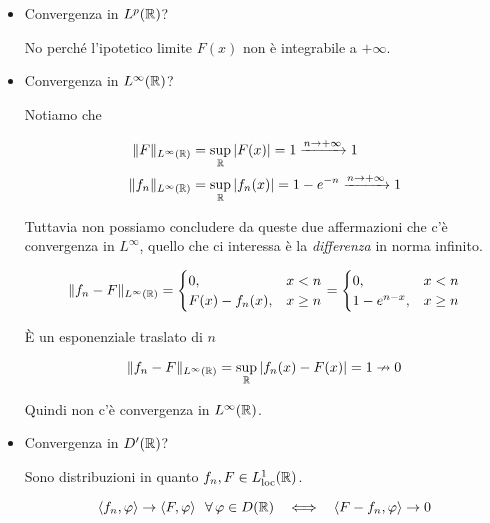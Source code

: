 \begin{itemize}
\item Convergenza in $L^{p}(\mathbb{R})$?

No perché l'ipotetico limite $F(x)$ non è integrabile a $ + \infty $.
\item Convergenza in $L^{\infty }(\mathbb{R})$?

Notiamo che

\begin{equation*}
\begin{aligned}
\Vert F\Vert _{L^{\infty }(\mathbb{R})} & = \sup _{\mathbb{R} }| F(x)| = 1\xrightarrow{n\rightarrow + \infty } 1\\
\Vert f_{n}\Vert _{L^{\infty }(\mathbb{R})} & = \sup _{\mathbb{R} }| f_{n}(x)| = 1 - e^{ - n}\xrightarrow{n\rightarrow + \infty } 1
\end{aligned}
\end{equation*}

Tuttavia non possiamo concludere da queste due affermazioni che c'è convergenza in $L^{\infty }$, quello che ci interessa è la \textit{differenza} in norma infinito.

\begin{equation*}
\Vert f_{n} - F\Vert _{L^{\infty }(\mathbb{R})} = \begin{cases}
0, & x < n\\
F(x) - f_{n}(x) , & x\geq n
\end{cases} = \begin{cases}
0, & x < n\\
1 - e^{n - x} , & x\geq n
\end{cases}
\end{equation*}

È un esponenziale traslato di $n$

\begin{equation*}
\Vert f_{n} - F\Vert _{L^{\infty }(\mathbb{R})} = \sup _{\mathbb{R} }| f_{n}(x) - F(x)| = 1\nrightarrow 0
\end{equation*}

Quindi non c'è convergenza in $L^{\infty }(\mathbb{R})$.
\item Convergenza in $D'(\mathbb{R})$?

Sono distribuzioni in quanto $f_{n} ,F\in L^{1}_{\operatorname{loc}}(\mathbb{R})$.

\begin{equation*}
\langle f_{n} ,\varphi \rangle \rightarrow \langle F,\varphi \rangle \ \ \forall \varphi \in D(\RR) \ \ \iff \ \ \langle F - f_{n} ,\varphi \rangle \rightarrow 0
\end{equation*}


\end{itemize}
